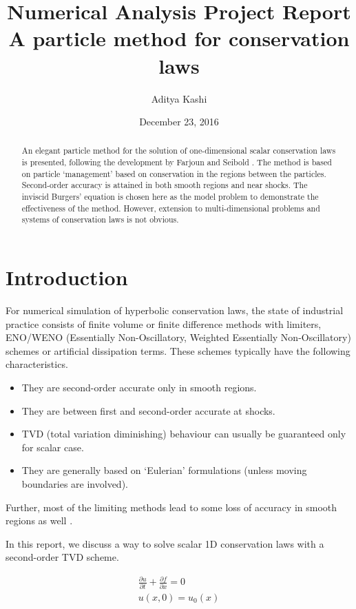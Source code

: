 \documentclass{article}
\author{Aditya Kashi}
\date{December 23, 2016}
\title{Numerical Analysis Project Report \\ \textbf{A particle method for conservation laws}}
\begin{document}
\maketitle

\begin{abstract}
An elegant particle method for the solution of one-dimensional scalar conservation laws is presented, following the development by Farjoun and Seibold \cite{particle}. The method is based on particle `management' based on conservation in the regions between the particles. Second-order accuracy is attained in both smooth regions and near shocks. The inviscid Burgers' equation is chosen here as the model problem to demonstrate the effectiveness of the method. However, extension to multi-dimensional problems and systems of conservation laws is not obvious.
\end{abstract}

\section{Introduction}
For numerical simulation of hyperbolic conservation laws, the state of industrial practice consists of finite volume or finite difference methods with limiters, ENO/WENO (Essentially Non-Oscillatory, Weighted Essentially Non-Oscillatory) schemes or artificial dissipation terms. These schemes typically have the following characteristics.
\begin{itemize}
	\item They are second-order accurate only in smooth regions.
	\item They are between first and second-order accurate at shocks.
	\item TVD (total variation diminishing) behaviour can usually be guaranteed only for scalar case.
	\item They are generally based on `Eulerian' formulations (unless moving boundaries are involved).
\end{itemize}
Further, most of the limiting methods lead to some loss of accuracy in smooth regions as well \cite{fvweno}.

In this report, we discuss a way to solve scalar 1D conservation laws with a second-order TVD scheme.

\begin{align}
\frac{\partial u}{\partial t} + \frac{\partial f}{\partial x} = 0 \\
u(x,0) = u_0(x)
\label{eq:problem}
\end{align}
\end{document}

